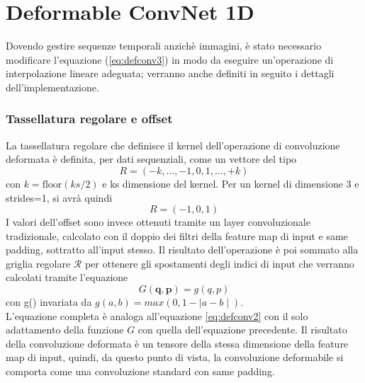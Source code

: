 \documentclass[12pt,a4paper]{report}
\begin{document}
    \newpage
    \section{Deformable ConvNet 1D} \label{sec:def}
    Dovendo gestire sequenze temporali anzich\`e immagini, \`e stato 
    necessario modificare l'equazione (\ref{eq:defconv3}) in modo
    da eseguire un'operazione di interpolazione lineare
    adeguata; verranno anche definiti in seguito i dettagli
    dell'implementazione.
    \subsubsection{Tassellatura regolare e offset}
    La tassellatura regolare che definisce il kernel 
    dell'operazione di convoluzione deformata \`e definita, 
    per dati sequenziali, come un vettore del tipo
    \begin{equation}
        R = (-k, \dots, -1, 0, 1, \dots, +k)
    \end{equation}
    con $k=\text{floor}(ks/2)$ e ks dimensione del kernel. 
    Per un kernel di dimensione 3 e strides=1, si avr\`a quindi
    \begin{equation}
        R = (-1, 0, 1)
    \end{equation}
    I valori dell'offset sono invece ottenuti tramite un layer
    convoluzionale tradizionale, calcolato con il doppio dei filtri 
    della feature map di input e same padding, sottratto all'input 
    stesso. Il risultato dell'operazione \`e poi sommato alla griglia
    regolare $\mathcal{R}$ per ottenere gli spostamenti degli indici di
    input che verranno calcolati tramite l'equazione 
    \begin{equation} \label{eq:5}
        G(\textbf{q}, \textbf{p}) = g(q, p)
    \end{equation}
    con g() invariata da $g(a, b) = max(0, 1-\mid a-b\mid)$.\\
    L'equazione completa \`e analoga all'equazione \ref{eq:defconv2}
    con il solo adattamento della funzione $G$ con quella dell'equazione
    precedente. Il risultato della convoluzione deformata \`e un tensore
    della stessa dimensione della feature map di input, quindi, da
    questo punto di vista, la convoluzione deformabile si comporta come
    una convoluzione standard con same padding. 
\end{document}
